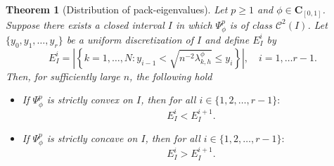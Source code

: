 \documentclass[11pt]{article}
\newtheorem{theorem}{Theorem}[section]
\begin{document}
\begin{theorem}[Distribution of pack-eigenvalues]\label{cl2.5}
Let $p \geq 1$ and $\phi \in \mathbf{C}_{[0,1]}$. Suppose there exists a closed interval $I$ in which $\Psi^p_{\phi} $ is of class $\mathcal{C}^2(I)$. Let $\{y_0, y_1, \ldots, y_r\}$ be a uniform discretization of $I$ and define $E_I^{i}$ by 
$$E_I^{i}=\left|\left\{ k=1,\dots,N: y_{i-1}< \sqrt{n^{-2}  \lambda_{k,h}^{\phi}}\leq y_{i}     \right\}\right|,\quad i=1,\dots r-1.$$
Then, for sufficiently large $n$, the following hold
\begin{itemize}
\item[1.] If $\Psi^p_{\phi}$ is strictly convex on $I$, then for all $i \in \{1, 2, \ldots, r-1\}:$
\begin{equation*}
E_I^{i}<E_I^{i+1}.
\end{equation*}

\item[2.] If $\Psi^p_{\phi}$ is strictly concave on $I$, then for all $i \in \{1, 2, \ldots, r-1\}:$
\begin{equation*}
E_I^{i}> E_I^{i+1}.
\end{equation*}
\end{itemize}
\end{theorem}
\end{document}
